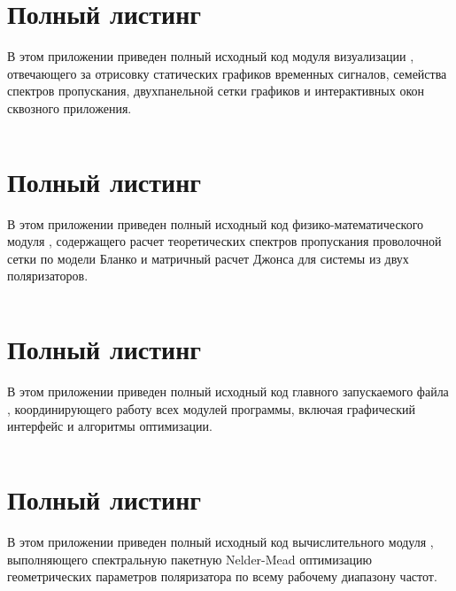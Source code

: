 \section[Полный листинг plots.py]{Полный листинг } \label{app:plots}
В этом приложении приведен полный исходный код модуля визуализации , отвечающего за отрисовку статических графиков временных сигналов, семейства спектров пропускания, двухпанельной сетки графиков и интерактивных окон сквозного приложения.

\inputminted{python}{../src/plots.py}


\section[Полный листинг theoretical.py]{Полный листинг } \label{app:theoretical}
В этом приложении приведен полный исходный код физико-математического модуля , содержащего расчет теоретических спектров пропускания проволочной сетки по модели Бланко и матричный расчет Джонса для системы из двух поляризаторов.

\inputminted{python}{../src/theoretical.py}

\section[Полный листинг main.py]{Полный листинг } \label{app:integrated_app}
В этом приложении приведен полный исходный код главного запускаемого файла , координирующего работу всех модулей программы, включая графический интерфейс и алгоритмы оптимизации.

\inputminted{python}{../src/main.py}

\section[Полный листинг frequency\_analysis.py]{Полный листинг } \label{app:frequency_analysis}
В этом приложении приведен полный исходный код вычислительного модуля , выполняющего спектральную пакетную Nelder-Mead оптимизацию геометрических параметров поляризатора по всему рабочему диапазону частот.

\inputminted{python}{../src/frequency_analysis.py}





